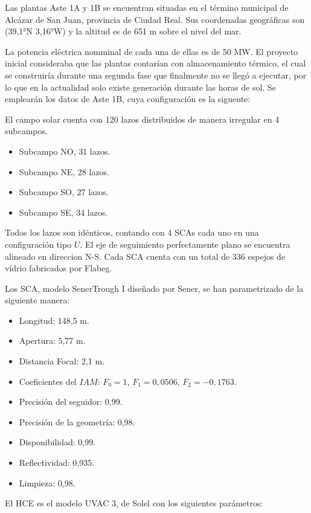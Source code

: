 \documentclass[11pt]{article}
\providecommand{\tightlist}{%
      \setlength{\itemsep}{0pt}\setlength{\parskip}{0pt}}
\begin{document}
Las plantas Aste 1A y 1B se encuentran situadas en el término municipal
de Alcázar de San Juan, provincia de Ciudad Real. Sus coordenadas
geográficas son (39,1°N 3,16°W) y la altitud es de 651 m sobre el nivel
del mar.

La potencia eléctrica nomminal de cada una de ellas es de 50 MW. El
proyecto inicial consideraba que las plantas contarían con
almacenamiento térmico, el cual se construiría durante una segunda fase
que finalmente no se llegó a ejecutar, por lo que en la actualidad solo
existe generación durante las horas de sol. Se emplearán los datos de
Aste 1B, cuya configuración es la siguente:

El campo solar cuenta con 120 lazos distribuidos de manera irregular en
4 subcampos.

\begin{itemize}
\tightlist
\item
  Subcampo NO, 31 lazos.
\item
  Subcampo NE, 28 lazos.
\item
  Subcampo SO, 27 lazos.
\item
  Subcampo SE, 34 lazos.
\end{itemize}

Todos los lazos son idénticos, contando con 4 SCAs cada uno en una
configuración tipo \(U\). El eje de seguimiento perfectamente plano se
encuentra alineado en direccion N-S. Cada SCA cuenta con un total de 336
espejos de vídrio fabricados por Flabeg.

Los SCA, modelo SenerTrough I diseñado por Sener, se han parametrizado
de la siguiente manera:

\begin{itemize}
\tightlist
\item
  Longitud: 148,5 m.
\item
  Apertura: 5,77 m.
\item
  Distancia Focal: 2,1 m.
\item
  Coeficientes del \(IAM\): \(F_{0}=1\), \(F_{1}=0,0506\),
  \(F_{2}=-0,1763\).
\item
  Precisión del seguidor: 0,99.
\item
  Precisión de la geometría: 0,98.
\item
  Disponibilidad: 0,99.
\item
  Reflectividad: 0,935.
\item
  Limpieza: 0,98.
\end{itemize}

El HCE es el modelo UVAC 3, de Solel con los siguientes parámetros:
\end{document}
